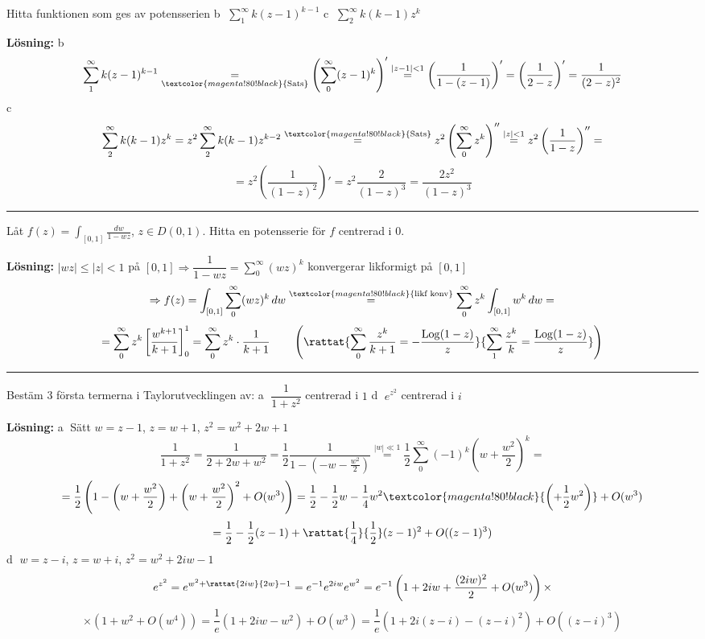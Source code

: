  \quad Hitta funktionen som ges av potensserien \quad \textcircled{b} $\displaystyle\sum_1^\infty k(z - 1)^{k-1}$ \quad \textcircled{c} $\displaystyle\sum_2^\infty k(k - 1)z^k$

\textbf{Lösning:} \textcircled{b}
\[ \sum_1^\infty k(z - 1)^{k-1} \underset{\textcolor{magenta!80!black}{\text{Sats}}}{=} \left( \sum_0^\infty (z - 1)^k \right)' \overset{|z - 1| < 1}{=} \left( \frac{1}{1 - (z - 1)} \right)' = \left( \frac{1}{2 - z} \right)' = \frac{1}{(2 - z)^2} \]
\textcircled{c}
\[ \sum_2^\infty k(k - 1)z^k = z^2 \sum_2^\infty k(k - 1)z^{k-2} \overset{\textcolor{magenta!80!black}{\text{Sats}}}{=} z^2\left( \sum_0^\infty z^k \right)'' \overset{|z| < 1}{=} z^2\left( \frac{1}{1 - z} \right)'' = \]
\[ = z^2\left( \frac{1}{(1 - z)^2} \right)' = z^2 \frac{2}{(1 - z)^3} = \frac{2z^2}{(1 - z)^3} \]

\noindent\rule{\linewidth}{0.4pt}

 \quad Låt $f(z) = \displaystyle\int_{[0, 1]} \frac{dw}{1 - wz}$, $z \in D(0, 1)$. Hitta en potensserie för $f$ centrerad i $0$.

\textbf{Lösning:} $|wz| \le |z| < 1$ på $[0, 1] \Rightarrow \dfrac{1}{1 - wz} = \displaystyle\sum_0^\infty (wz)^k$ konvergerar likformigt på $[0, 1]$
\[ \Rightarrow f(z) = \int_{[0, 1]} \sum_0^\infty (wz)^k\,dw \overset{\textcolor{magenta!80!black}{\text{likf konv}}}{=} \sum_0^\infty z^k \int_{[0, 1]} w^k\,dw = \]
\[ = \sum_0^\infty z^k \left[ \frac{w^{k+1}}{k + 1} \right]_0^1 = \sum_0^\infty z^k \cdot \frac{1}{k + 1} \qquad \left( \rattat{\sum_0^\infty \frac{z^k}{k + 1} = -\frac{\operatorname{Log}(1 - z)}{z}}{\sum_1^\infty \frac{z^k}{k} = \frac{\operatorname{Log}(1 - z)}{z}} \right) \]

\noindent\rule{\linewidth}{0.4pt}

 \quad Bestäm 3 första termerna i Taylorutvecklingen av: \quad \textcircled{a} $\dfrac{1}{1 + z^2}$ centrerad i $1$ \quad \textcircled{d} $e^{z^2}$ centrerad i $i$

\textbf{Lösning:} \textcircled{a} Sätt $w = z - 1$, $z = w + 1$, $z^2 = w^2 + 2w + 1$
\[ \frac{1}{1 + z^2} = \frac{1}{2 + 2w + w^2} = \frac{1}{2} \frac{1}{1 - (-w - \frac{w^2}{2})} \overset{|w| \ll 1}{=} \frac{1}{2} \sum_0^\infty (-1)^k\left( w + \frac{w^2}{2} \right)^k = \]
\[ = \frac{1}{2}\left( 1 - \left( w + \frac{w^2}{2} \right) + \left( w + \frac{w^2}{2} \right)^2 + O(w^3) \right) = \frac{1}{2} - \frac{1}{2}w - \frac{1}{4}w^2 \textcolor{magenta!80!black}{\left( + \frac{1}{2}w^2 \right)} + O(w^3) \]
\[ = \frac{1}{2} - \frac{1}{2}(z - 1) + \rattat{\frac{1}{4}}{\frac{1}{2}}(z - 1)^2 + O((z - 1)^3) \]
\textcircled{d} $w = z - i$, $z = w + i$, $z^2 = w^2 + 2iw - 1$
\[ e^{z^2} = e^{w^2 + \rattat{2iw}{2w} - 1} = e^{-1}e^{2iw}e^{w^2} = e^{-1}\left( 1 + 2iw + \frac{(2iw)^2}{2} + O(w^3) \right) \times \]
\[ \times (1 + w^2 + O(w^4)) = \frac{1}{e}(1 + 2iw - w^2) + O(w^3) = \frac{1}{e}(1 + 2i(z - i) - (z - i)^2) + O((z - i)^3) \]
